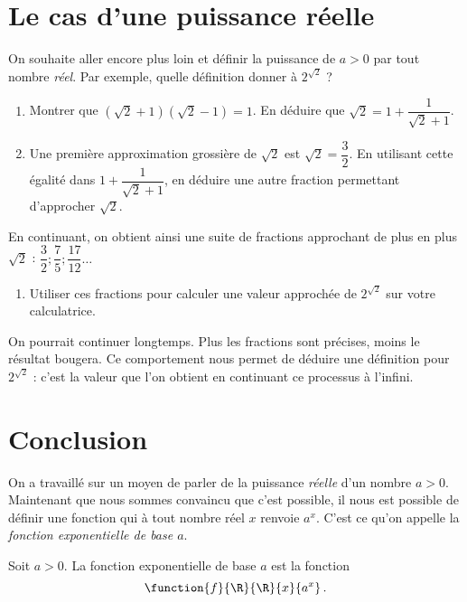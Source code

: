 \documentclass{article}
\begin{document}
\section{Le cas d'une puissance réelle}
On souhaite aller encore plus loin et définir la puissance de $a>0$ par tout nombre \emph{réel}. Par exemple, quelle définition donner à $2^{\sqrt{2}}$ ?
\begin{enumerate}[resume*]
\item Montrer que $(\sqrt{2} + 1)(\sqrt{2} - 1) = 1$. En déduire que $\sqrt{2} = 1 + \dfrac{1}{\sqrt{2} + 1}$.
\item Une première approximation grossière de $\sqrt{2}$ est $\sqrt{2}=\dfrac{3}{2}$. En utilisant cette égalité dans $1 + \dfrac{1}{\sqrt{2}+1}$, en déduire une autre fraction permettant d'approcher $\sqrt{2}$.
\end{enumerate}
En continuant, on obtient ainsi une suite de fractions approchant de plus en plus $\sqrt{2}$ : $\dfrac{3}{2}; \dfrac{7}{5}; \dfrac{17}{12}\dots$
\begin{enumerate}[resume*]
\item Utiliser ces fractions pour calculer une valeur approchée de $2^{\sqrt{2}}$ sur votre calculatrice.
\end{enumerate}
On pourrait continuer longtemps. Plus les fractions sont précises, moins le résultat bougera. Ce comportement nous permet de déduire une définition pour $2^{\sqrt{2}}$ : c'est la valeur que l'on obtient en continuant ce processus à l'infini.
\section{Conclusion}
On a travaillé sur un moyen de parler de la puissance \emph{réelle} d'un nombre $a>0$. Maintenant que nous sommes convaincu que c'est possible, il nous est possible de définir une fonction qui à tout nombre réel $x$ renvoie $a^x$. C'est ce qu'on appelle la \emph{fonction exponentielle de base $a$}.
\begin{definition}
Soit $a>0$. La fonction exponentielle de base $a$ est la fonction
\begin{equation*}
\function{f}{\R}{\R}{x}{a^x}\,.    
\end{equation*}    
\end{definition} 
\end{document}

